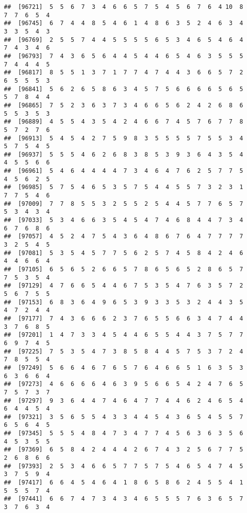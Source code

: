 \documentclass[
]{book}
\begin{document}
\begin{verbatim}
##  [96721]  5  5  6  7  3  4  6  6  5  7  5  4  5  6  7  6  4 10  8  7  7  6  5  4
##  [96745]  6  7  4  4  8  5  4  6  1  4  8  6  3  5  2  4  6  3  4  3  3  5  4  3
##  [96769]  2  5  5  7  4  4  5  5  5  5  6  5  3  4  6  5  4  6  4  7  4  3  4  6
##  [96793]  7  4  3  6  5  6  4  4  5  4  4  6  5  4  6  3  5  5  5  7  4  4  4  5
##  [96817]  8  5  5  1  3  7  1  7  7  4  7  4  4  3  6  6  5  7  2  6  5  5  5  3
##  [96841]  5  6  2  6  5  8  6  3  4  5  7  5  6  6  6  6  5  6  5  5  7  8  4  4
##  [96865]  7  5  2  3  6  3  7  3  4  6  6  5  6  2  4  2  6  8  6  5  5  3  5  3
##  [96889]  4  5  5  4  3  5  4  2  4  6  6  7  4  5  7  6  7  7  8  5  7  2  7  6
##  [96913]  5  4  5  4  2  7  5  9  8  3  5  5  5  5  7  5  5  3  4  5  7  5  4  5
##  [96937]  5  5  5  4  6  2  6  8  3  8  5  3  9  3  6  4  3  5  4  4  5  5  6  6
##  [96961]  5  4  6  4  4  4  4  7  3  4  6  4  7  6  2  5  7  7  5  4  5  6  2  5
##  [96985]  5  7  5  4  6  5  3  5  7  5  4  4  5  5  7  3  2  3  1  7  7  5  4  6
##  [97009]  7  7  8  5  5  3  2  5  5  2  5  4  4  5  7  7  6  5  7  5  3  4  3  4
##  [97033]  5  3  4  6  6  3  5  4  5  4  7  4  6  8  4  4  7  3  4  6  7  6  8  6
##  [97057]  4  5  2  4  7  5  4  3  6  4  8  6  7  6  4  7  7  7  7  3  2  5  4  5
##  [97081]  5  3  5  4  5  7  7  5  6  2  5  7  4  5  8  4  2  4  6  4  4  6  6  4
##  [97105]  6  5  6  5  2  6  6  5  7  8  6  5  6  5  2  8  6  5  7  7  5  3  5  4
##  [97129]  4  7  6  6  5  4  4  6  7  5  3  5  4  7  6  3  5  7  2  5  6  7  5  5
##  [97153]  6  8  3  6  4  9  6  5  3  9  3  3  5  3  2  4  4  3  5  4  7  2  4  4
##  [97177]  7  4  3  6  6  6  2  3  7  6  5  5  6  6  3  4  7  4  4  3  7  6  8  5
##  [97201]  1  4  7  3  3  4  5  4  4  6  5  5  4  4  3  7  5  7  7  6  9  7  4  5
##  [97225]  7  5  3  5  4  7  3  8  5  8  4  4  5  7  5  3  7  2  4  7  8  5  5  4
##  [97249]  5  6  6  4  6  7  6  5  7  6  4  6  6  5  1  6  3  5  3  6  3  6  6  4
##  [97273]  4  6  6  6  6  4  6  3  9  5  6  6  5  4  2  4  7  6  5  7  5  7  3  7
##  [97297]  9  3  6  4  4  7  4  6  4  7  7  4  4  6  2  4  6  5  4  6  4  4  5  4
##  [97321]  3  5  6  5  5  4  3  3  4  4  5  4  3  6  5  4  5  5  7  6  5  6  4  5
##  [97345]  5  5  5  4  8  4  7  3  4  7  7  4  5  6  3  6  3  5  6  4  5  3  5  5
##  [97369]  6  5  8  4  2  4  4  4  2  6  7  4  3  2  5  6  7  7  5  2  6  8  6  6
##  [97393]  2  5  3  4  6  6  5  7  7  5  7  5  4  6  5  4  7  4  5  3  7  5  9  4
##  [97417]  6  6  4  5  4  6  4  1  8  6  5  8  6  2  4  5  5  4  1  5  5  5  7  4
##  [97441]  6  6  7  4  7  3  4  3  4  6  5  5  5  7  6  3  6  5  7  3  7  6  3  4

\end{verbatim}
\end{document}
